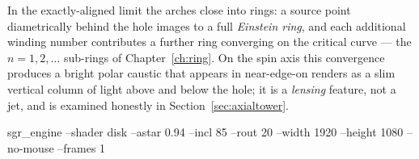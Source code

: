 In the exactly-aligned limit the arches close into rings: a source
point diametrically behind the hole images to a full \emph{Einstein
ring}, and each additional winding number contributes a further ring
converging on the critical curve — the $n = 1, 2, \dots$ sub-rings of
Chapter~\ref{ch:ring}. On the spin axis this convergence produces a
bright polar caustic that appears in near-edge-on renders as a slim
vertical column of light above and below the hole; it is a
\emph{lensing} feature, not a jet, and is examined honestly in
Section~\ref{sec:axialtower}.

%
{sgr\_engine --shader disk --astar 0.94 --incl 85 --rout 20 --width
1920 --height 1080 --no-mouse --frames 1}
